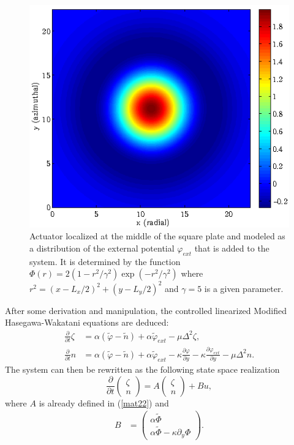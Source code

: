 \documentclass[12pt,lot, lof]{puthesis}
\begin{document}
\begin{figure}[htb]
\centering
\includegraphics[width=0.7\linewidth]{B1} 
\caption{Actuator localized at the middle of the square plate and modeled as a distribution of the external potential $\varphi_{ext}$ that is added to the system. It is determined by the function $\Phi(r) = 2 \left(1-r^2/\gamma^2\right) \exp \left(-r^2/\gamma^2\right)$ where $r^2 =\left(x- L_x/2\right)^2 +\left(y- L_y/2\right)^2 $ and $\gamma = 5$ is a given parameter. }
\label{actuator1}
\end{figure}


After some derivation and manipulation, the controlled linearized Modified Hasegawa-Wakatani equations are deduced:
\begin{subequations}
\begin{align}
	\frac{\partial}{\partial t} \zeta &= \alpha (\tilde{\varphi}-\tilde{n}) +\alpha \tilde{\varphi}_{ext} - \mu \Delta^2 \zeta, \\
	\frac{\partial}{\partial t} n  &= \alpha (\tilde{\varphi}- \tilde{n}) +\alpha \tilde{\varphi}_{ext} -\kappa \frac{\partial \varphi}{\partial y}-\kappa \frac{\partial \varphi_{ext}}{\partial y}- \mu \Delta^2 n.
\end{align}
\end{subequations}
The system can then be rewritten as the following state space realization
%
\begin{equation}
	\frac{\partial}{\partial t} {\left( \begin{matrix} {\zeta} \\ {n} \end{matrix} \right)} =      A {\left( \begin{matrix} {\zeta} \\ {n} \end{matrix} \right)} + B u, 
\label{sy}
\end{equation}
where $A$ is already defined in (\ref{mat22})  and
%
\begin{align}
\label{init}
	B &= {\left( \begin{matrix} {\alpha \tilde{\Phi}} \\ {\alpha \tilde{\Phi} - \kappa \partial_y \Phi} \end{matrix} \right)} .
\end{align}
\end{document}
